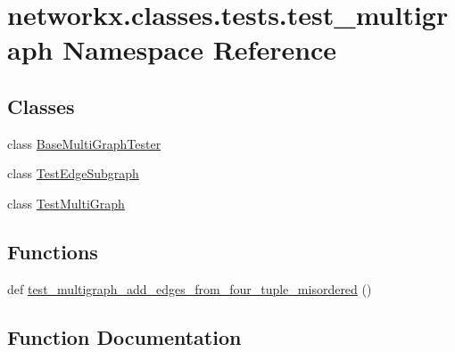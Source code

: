 \hypertarget{namespacenetworkx_1_1classes_1_1tests_1_1test__multigraph}{}\section{networkx.\+classes.\+tests.\+test\+\_\+multigraph Namespace Reference}
\label{namespacenetworkx_1_1classes_1_1tests_1_1test__multigraph}
\subsection*{Classes}
\begin{DoxyCompactItemize}
\item 
class \hyperlink{classnetworkx_1_1classes_1_1tests_1_1test__multigraph_1_1BaseMultiGraphTester}{Base\+Multi\+Graph\+Tester}
\item 
class \hyperlink{classnetworkx_1_1classes_1_1tests_1_1test__multigraph_1_1TestEdgeSubgraph}{Test\+Edge\+Subgraph}
\item 
class \hyperlink{classnetworkx_1_1classes_1_1tests_1_1test__multigraph_1_1TestMultiGraph}{Test\+Multi\+Graph}
\end{DoxyCompactItemize}
\subsection*{Functions}
\begin{DoxyCompactItemize}
\item 
def \hyperlink{namespacenetworkx_1_1classes_1_1tests_1_1test__multigraph_a68f434d5b8e88336141eb3897861ff5e}{test\+\_\+multigraph\+\_\+add\+\_\+edges\+\_\+from\+\_\+four\+\_\+tuple\+\_\+misordered} ()
\end{DoxyCompactItemize}


\subsection{Function Documentation}
\mbox{\label{namespacenetworkx_1_1classes_1_1tests_1_1test__multigraph_a68f434d5b8e88336141eb3897861ff5e}} 
